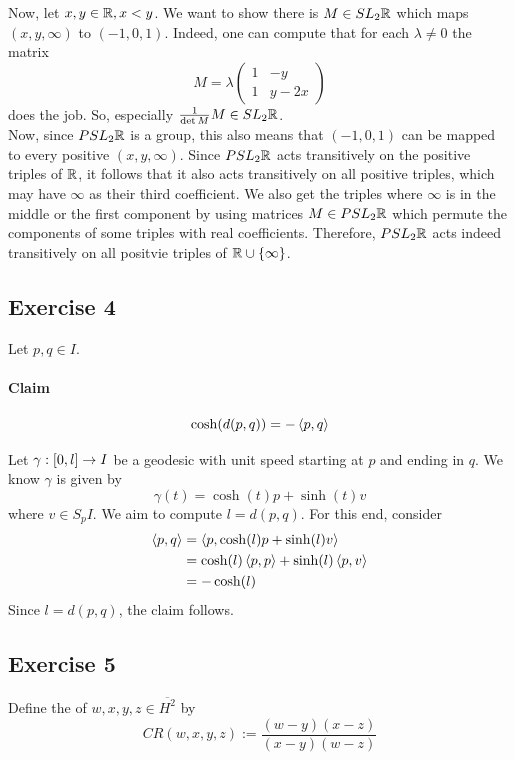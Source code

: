 \documentclass{book}
\renewcommand{\l}[1]{\overline{#1}}
\begin{document}
\begin{Beweis}{}
	Now, let $x,y \in \mathbb{R}, x<y$. We want to show there is $M \in SL_2\mathbb{R}$ which maps $(x,y, \infty)$ to $(-1,0,1)$. Indeed, one can compute that for each $\lambda \neq 0$ the matrix
	\[ M = \lambda\left(
	\begin{matrix}
	1 & -y \\
	1 & y - 2x
	\end{matrix}
	\right) \]
	does the job. So, especially $\frac{1}{\det M} M \in SL_2\mathbb{R}$.\\
	Now, since $PSL_2\mathbb{R}$ is a group, this also means that $(-1,0,1)$ can be mapped to every positive $(x,y,\infty)$. Since $PSL_2\mathbb{R}$ acts transitively on the positive triples of $\mathbb{R}$, it follows that it also acts transitively on all positive triples, which may have $\infty$ as their third coefficient. We also get the triples where $\infty$ is in the middle or the first component by using matrices $M \in PSL_2\mathbb{R}$ which permute the components of some triples with real coefficients. Therefore, $PSL_2\mathbb{R}$ acts indeed transitively on all positvie triples of $\mathbb{R} \cup \{\infty\}$.
\end{Beweis}

\subsection{Exercise 4}
Let $p,q \in I$.
\paragraph{Claim}
\[ \cosh (d(p,q)) = -\left<p,q\right> \]
\begin{Beweis}{}
	Let $\gamma : [0,l]\overset{}{\rightarrow} I$ be a geodesic with unit speed starting at $p$ and ending in $q$. We know $\gamma$ is given by
	\[ \gamma(t) = \cosh(t) p + \sinh(t) v \]
	where $v \in S_pI$. We aim to compute $l = d(p,q)$. For this end, consider
	\begin{align*}
	\left<p,q\right> &= \left<p, \cosh(l)p + \sinh(l)v\right> \\
	&= \cosh(l)\left<p,p\right> + \sinh(l)\left<p,v\right>\\
	&= -\cosh(l)
	\end{align*}
	Since $l = d(p,q)$, the claim follows.
\end{Beweis}


\subsection{Exercise 5}
Define the  of $w,x,y,z \in \l{H^2}$ by
\[ CR(w,x,y,z) := \frac{(w-y)(x-z)}{(x-y)(w-z)} \]
\end{document}
